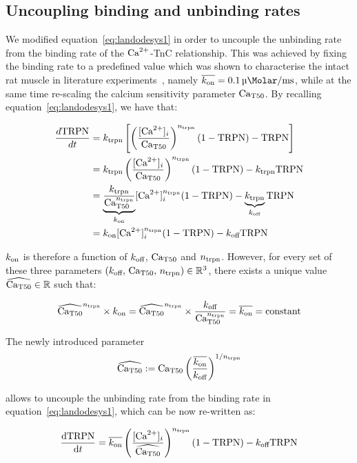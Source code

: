 %
%
%
\subsection{Uncoupling binding and unbinding rates}
We modified equation~\eqref{eq:landodesys1} in order to uncouple the unbinding rate from the binding rate of the $\textrm{Ca}^{2+}$-TnC relationship. This was achieved by fixing the binding rate to a predefined value which was shown to characterise the intact rat muscle in literature experiments~\cite{Niederer:2006}, namely $\overline{\kon}=\SI{0.1}{\micro\Molar\per\milli\second}$, while at the same time re-scaling the calcium sensitivity parameter $\textrm{Ca}_{\textrm{T}50}$. By recalling equation~\eqref{eq:landodesys1}, we have that:

\begin{align}
    \frac{d\text{TRPN}}{dt} &=k_{\textrm{trpn}}\left[\left(\frac{[\textrm{Ca}^{2+}]_{i}}{\textrm{Ca}_{\textrm{T}50}}\right)^{n_{\textrm{trpn}}}(1-\textrm{TRPN})-\textrm{TRPN}\right] \\
    &= k_{\textrm{trpn}}\left(\frac{[\textrm{Ca}^{2+}]_{i}}{\textrm{Ca}_{\textrm{T}50}}\right)^{n_{\textrm{trpn}}}(1-\textrm{TRPN})-k_{\textrm{trpn}}\textrm{TRPN} \\
    &= \underbrace{\frac{k_{\textrm{trpn}}}{\textrm{Ca}_{\textrm{T}50}^{n_{\textrm{trpn}}}}}_{k_{\textrm{on}}}[\textrm{Ca}^{2+}]_{i}^{n_{\textrm{trpn}}}(1-\textrm{TRPN})-\underbrace{k_{\textrm{trpn}}}_{k_{\textrm{off}}}\textrm{TRPN} \\
    &= k_{\textrm{on}}[\textrm{Ca}^{2+}]_{i}^{n_{\textrm{trpn}}}(1-\textrm{TRPN})-k_{\textrm{off}}\textrm{TRPN}
\end{align}

\noindent
$k_{\textrm{on}}$ is therefore a function of $k_{\textrm{off}}$, $\textrm{Ca}_{\textrm{T}50}$ and $n_{\textrm{trpn}}$. However, for every set of these three parameters $(k_{\textrm{off}},\,\textrm{Ca}_{\textrm{T}50},\,n_{\textrm{trpn}})\in\mathbb{R}^{3}$, there exists a unique value $\widehat{\textrm{Ca}_{\textrm{T}50}}\in\mathbb{R}$ such that:

\begin{equation}
    \widehat{\textrm{Ca}_{\textrm{T}50}}^{n_{\textrm{trpn}}}\times k_{\textrm{on}} = \widehat{\textrm{Ca}_{\textrm{T}50}}^{n_{\textrm{trpn}}}\times\frac{k_{\textrm{off}}}{\textrm{Ca}_{\textrm{T}50}^{n_{\textrm{trpn}}}} = \overline{k_{\textrm{on}}} = \text{constant}
\end{equation}

\noindent
The newly introduced parameter
%
\begin{equation}
    \widehat{\textrm{Ca}_{\textrm{T}50}} := \textrm{Ca}_{\textrm{T}50}\left(\frac{\overline{k_{\textrm{on}}}}{k_{\textrm{off}}}\right)^{1/n_{\textrm{trpn}}}
\end{equation}

\noindent
allows to uncouple the unbinding rate from the binding rate in equation~\eqref{eq:landodesys1}, which can be now re-written as:

\begin{equation}\label{eq:landodesys1mod}
    \dfrac{\mathrm{d}{\textrm{TRPN}}}{\mathrm{d}{t}} = \overline{k_{\textrm{on}}}\left(\frac{[\textrm{Ca}^{2+}]_{i}}{\widehat{\textrm{Ca}_{\textrm{T}50}}}\right)^{n_{\textrm{trpn}}}(1-\textrm{TRPN})-k_{\textrm{off}}\textrm{TRPN} 
\end{equation}

